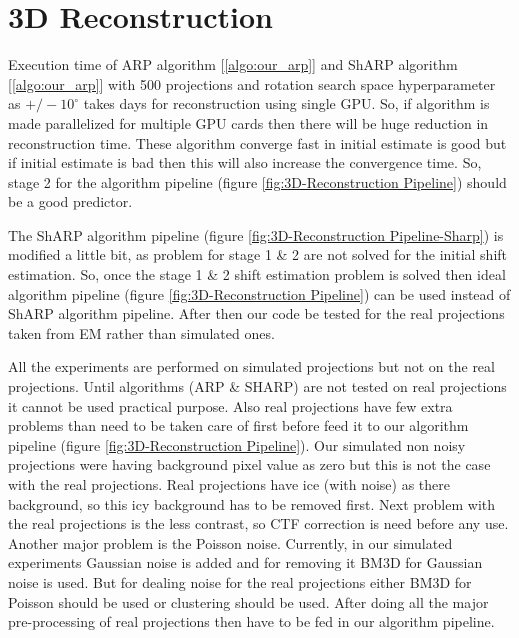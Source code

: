 \documentclass{report}
\begin{document}
\section{3D Reconstruction}

Execution time of ARP algorithm [\ref{algo:our_arp}] and ShARP algorithm [\ref{algo:our_arp}] with 500 projections and rotation search space hyperparameter as $+/- 10^{\circ}$ takes days for reconstruction using single GPU. So, if algorithm is made parallelized for multiple GPU cards then there will be huge reduction in reconstruction time. These algorithm converge fast in initial estimate is good but if initial estimate is bad then this will also increase the convergence time. So, stage 2 for the algorithm pipeline (figure \ref{fig:3D-Reconstruction Pipeline}) should be a good predictor.

The ShARP algorithm pipeline (figure \ref{fig:3D-Reconstruction Pipeline-Sharp}) is modified a little bit, as problem for stage 1 \&  2 are not solved for the initial shift estimation. So, once the stage 1 \&  2 shift estimation problem is solved then ideal algorithm pipeline (figure \ref{fig:3D-Reconstruction Pipeline}) can be used instead of  ShARP algorithm pipeline. After then our code be tested for the real projections taken from EM rather than simulated ones.

All the experiments are performed on simulated projections but not on the real projections. Until algorithms  (ARP \& SHARP) are  not tested on real projections it cannot be used practical purpose. Also real projections have few extra problems than need to be taken care of first before feed it to our algorithm pipeline (figure \ref{fig:3D-Reconstruction Pipeline}). Our simulated non noisy projections were having background pixel value as zero but this is not the case with the real projections. Real projections have ice (with noise) as there background, so this icy background has to be removed first. Next problem with the real projections is the less contrast, so CTF correction is need before any use. Another major problem is the Poisson noise. Currently, in our simulated experiments Gaussian noise is added and for removing it BM3D for Gaussian noise is used. But for dealing noise for the real projections either BM3D for Poisson should be used or clustering should be used. After doing all the major pre-processing of real projections then have to be fed in our algorithm pipeline.    



\end{document}
